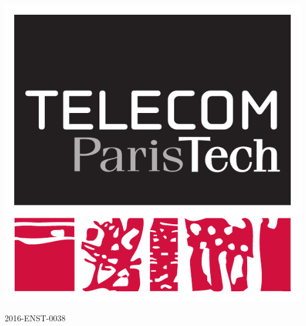 


\pagestyle{empty}

\AddToShipoutPicture*{\BackgroundPicCover}

\begin{flushright}

\includegraphics[scale=0.3]{img/logos/telecom.pdf}

{\small {2016-ENST-0038}}

\end{flushright}

